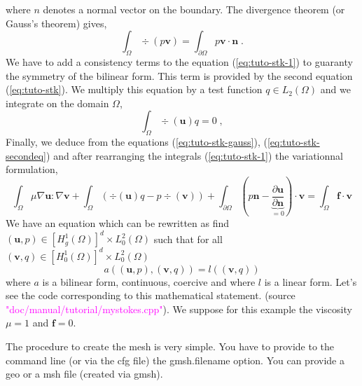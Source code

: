 %
where $n$ denotes a normal vector on the boundary.
The divergence theorem (or Gauss's theorem) gives,
%
\begin{equation}
\int_\Omega \div(p \mathbf v) = \int_{\partial\Omega} p \mathbf v\cdot \mathbf n \;.
\label{eq:tuto-stk-gauss}
\end{equation}
%
We have to add a consistency terms to the equation (\ref{eq:tuto-stk-1}) to
guaranty the symmetry of the bilinear form.
This term is provided by the second equation (\ref{eq:tuto-stk}). We multiply this equation
by a test function $q\in L_2(\Omega)$ and we integrate on the domain $\Omega$,
%
\begin{equation}
\int_{\Omega} \div(\mathbf u) q = 0 \;,
\label{eq:tuto-stk-secondeq}
\end{equation}
%
Finally, we deduce from the equations (\ref{eq:tuto-stk-gauss}), (\ref{eq:tuto-stk-secondeq})
and after rearranging the integrals (\ref{eq:tuto-stk-1}) the variationnal formulation,
%
\begin{equation}
\int_\Omega \mu \nabla \mathbf u :\nabla \mathbf v
+\int_\Omega \left( \div(\mathbf u) q - p \div(\mathbf v) \right)
+
    \int_{\partial\Omega} \left( p \mathbf n - 
    \underbrace{\frac{\partial \mathbf u}{\partial \mathbf n}}_{=0} \right)
     \cdot \mathbf v
=\int_\Omega \mathbf f \cdot \mathbf v 
\label{eq:tuto-stk-varform}
\end{equation}
%
We have an equation which can be rewritten as find $(\mathbf u,p)\in [H_g^1(\Omega)]^d\times L_0^2(\Omega)$
such that for all $(\mathbf v,q) \in [H_0^1(\Omega)]^d \times L_0^2(\Omega)$
\begin{equation}
    a((\mathbf u,p),(\mathbf v,q)) = l((\mathbf v,q))
\label{eq:tuto-stk-2}
\end{equation}
%
where $a$ is a bilinear form, continuous, coercive and where $l$ is a linear form.
Let's see the \feel code corresponding to this mathematical statement.
(source \textcolor{magenta}{"doc/manual/tutorial/mystokes.cpp"}).
We suppose for this example the viscosity $\mu=1$ and $\mathbf f = 0$.
%
\vspace{2mm}

\vspace{2mm}
%

The procedure to create the mesh is very simple.
You have to provide to the command line (or via the cfg file) the gmsh.filename option.
You can provide a geo or a msh file (created via gmsh).

